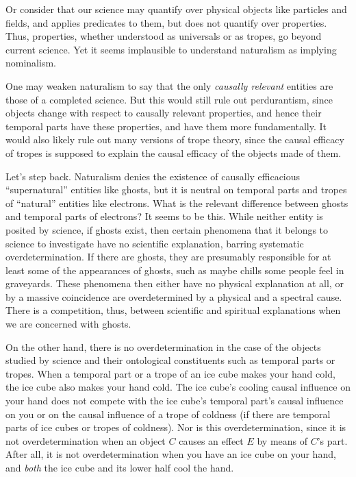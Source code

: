 Or consider that our science may quantify over physical objects like particles and fields, and applies predicates to them, but 
does not quantify over properties. Thus, properties, whether understood as universals or as tropes, go beyond current science.
Yet it seems implausible to understand naturalism as implying nominalism.

One may weaken naturalism to say that the only \textit{causally relevant} entities are those of a completed science. But 
this would still rule out perdurantism, since objects change with respect to causally relevant properties, and hence their
temporal parts have these properties, and have them more fundamentally. It would also likely rule out many versions of trope
theory, since the causal efficacy of tropes is supposed to explain the causal efficacy of the objects made of them.

Let's step back. Naturalism denies the existence of causally efficacious ``supernatural'' entities like 
ghosts, but it is neutral on temporal parts and tropes of ``natural'' entities like electrons. 
What is the relevant difference between ghosts and temporal parts of electrons? It seems to be this. While
neither entity is posited by science, if ghosts exist, then certain phenomena that it belongs to science 
to investigate have no scientific explanation, barring systematic overdetermination. If there are ghosts,
they are presumably responsible for at least some of the appearances of ghosts, such as maybe chills some 
people feel in graveyards. These phenomena then either have no physical explanation at all, or by a massive
coincidence are overdetermined by a physical and a spectral cause. There is a competition, thus, between 
scientific and spiritual explanations when we are concerned with ghosts. 

On the other hand, there is no overdetermination in the case of the objects studied by science and their ontological
constituents such as temporal parts or tropes. When a temporal part or a trope of an ice cube makes 
your hand cold, the ice cube also makes your hand cold. The ice cube's cooling causal influence on your hand
does not compete with the ice cube's temporal part's causal influence on you or on the causal influence of 
a trope of coldness (if there are temporal parts of ice cubes or tropes of coldness). Nor is this overdetermination,
since it is not overdetermination when an object $C$ causes an effect $E$ by means of $C$'s part. After all,
it is not overdetermination when you have an ice cube on your hand, and \textit{both} the ice cube and its lower half
cool the hand.

